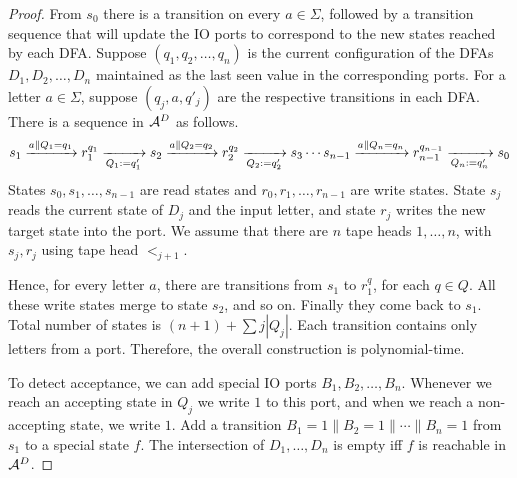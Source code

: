 \begin{proof}
    From $s_0$ there is a transition on every $a \in \Sigma$, followed by a transition sequence that will update the IO ports to correspond to the new states reached by each DFA. Suppose $(q_1, q_2, \dots, q_n)$ is the current configuration of the DFAs $D_1, D_2, \dots, D_n$ maintained as the last seen value in the corresponding ports. For a letter $a \in \Sigma$, suppose $(q_j, a, q'_j)$ are the respective transitions in each DFA. There is a sequence in $\mathcal{A}^D$ as follows.
    \begin{align*}
    s_1 \xrightarrow{a \parallel Q_1 = q_1} r^{q_1}_1 \xrightarrow[Q_1 := q'_1]{} s_2 \xrightarrow{a \parallel Q_2 = q_2} r^{q_2}_2 \xrightarrow[Q_2 := q'_2]{} s_3 \cdots s_{n-1} \xrightarrow{a \parallel Q_n = q_n} r^{q_{n-1}}_{n-1} \xrightarrow[Q_n := q'_n]{} s_0 
    \end{align*}
    States $s_0, s_1, \dots, s_{n-1}$ are read states and $r_0, r_1, \dots, r_{n-1}$ are write states. State $s_j$ reads the current state of $D_j$ and the input letter, and state $r_j$ writes the new target state into the port. We assume that there are $n$ tape heads $1, \dots, n$, with $s_j, r_j$ using tape head $\lt_{j+1}$. 

    Hence, for every letter $a$, there are transitions from $s_1$ to $r^{q}_1$, for each $q \in Q$. All these write states merge to state $s_2$, and so on. Finally they come back to $s_1$. Total number of states is $(n + 1) + \sum{j} |Q_j|$. Each transition contains only letters from a port. Therefore, the overall construction is polynomial-time.
    
    To detect acceptance, we can add special IO ports $B_1, B_2, \dots, B_n$. Whenever we reach an accepting state in $Q_j$ we write $1$ to this port, and when we reach a non-accepting state, we write $1$. Add a transition $B_1 = 1 \parallel B_2 = 1 \parallel \cdots \parallel B_n = 1$ from $s_1$ to a special state $f$. The intersection of $D_1, \dots, D_n$ is empty iff $f$ is reachable in $\mathcal{A}^D$. 


\end{proof}